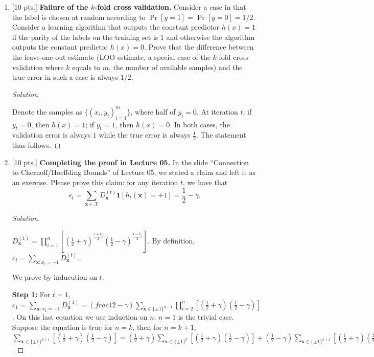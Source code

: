 \documentclass[12pt,letterpaper]{article}
\newenvironment{solution}{%
  \begin{proof}[Solution]$ $\par\nobreak\ignorespaces
}{%
  \end{proof}
}
\def \x{\boldsymbol{x}}
\begin{document}
\begin{enumerate}
\item {[10 pts.]} {\bf Failure of the $k$-fold cross validation.} Consider a case in that the label is chosen at random according to $\Pr[y = 1] = \Pr[y = 0] = 1/2$. Consider a learning algorithm that outputs the constant predictor $h(x) = 1$ if the parity of the labels on the training set is $1$ and otherwise the algorithm outputs the constant predictor $h(x) = 0$. Prove that the difference between the leave-one-out estimate (LOO estimate, a special case of the $k$-fold cross validation where $k$ equals to $m$, the number of available samples) and the true error in such a case is always $1/2$.
\begin{solution}
  Denote the samples as $\{(x_{i},y_{i})_{i=1}^{m}\}$, where half of $y_{i}=0$. At iteration $t$, if $y_{t}=0$, then $h(x)=1$; if $y_{t}=1$, then $h(x)=0$. In both cases, the validation error is always $1$ while the true error is always $\frac{1}{2}$. The statement thus follows.  
\end{solution}

\item {[10 pts.]} {\bf Completing the proof in Lecture 05.} In the slide ``Connection to Chernoff/Hoeffding Bounds'' of Lecture 05, we stated a claim and left it as an exercise. Please prove this claim: for any iteration $t$, we have that 
\[
\epsilon_t = \sum_{\bm{x} \in \mathcal{X}} D_{\bm{x}}^{(t)} \mathbf{1}[h_t(\bm{x}) = +1] = \frac12 - \gamma .
\]

\begin{solution}
  $D_{\x}^{(1)}=\prod_{i=1}^{n}[(\frac{1}{2}+\gamma)^{\frac{1+x_{i}}{2}}(\frac{1}{2}-\gamma)^{\frac{1-x_{i}}{2}}]$. By definition, $\varepsilon_{t}=\sum_{\bm{x}:x_{t}=-1}D_{\bm{x}}^{(t)}$.

  We prove by inducution on $t$. %

  \textbf{Step 1:} For $t=1$, $\varepsilon_{1}=\sum_{\bm{x}:x_{1}=-1}D^{(1)}_{\x}=(frac{1}{2}-\gamma)\sum_{\tilde{\x}\in\{\pm 1\}^{n-1}}\prod_{i=2}^{n}[(\frac{1}{2}+\gamma)(\frac{1}{2}-\gamma)]$. On this last equation we use induction on $n$: $n=1$ is the trivial case. Suppose the equation is true for $n=k$, then for $n=k+1$, $ \sum_{\bm{x}\in\{\pm 1\}^{k+1}}[(\frac{1}{2}+\gamma)(\frac{1}{2}-\gamma)]=(\frac{1}{2}+\gamma)\sum_{\bm{x}\in\{\pm 1\}^{k}}[(\frac{1}{2}+\gamma)(\frac{1}{2}-\gamma)]+(\frac{1}{2}-\gamma)\sum_{\bm{x}\in\{\pm 1\}^{k+1}}[(\frac{1}{2}+\gamma)(\frac{1}{2}-\gamma)]=1$.


\end{solution}
\end{enumerate}
\end{document}
